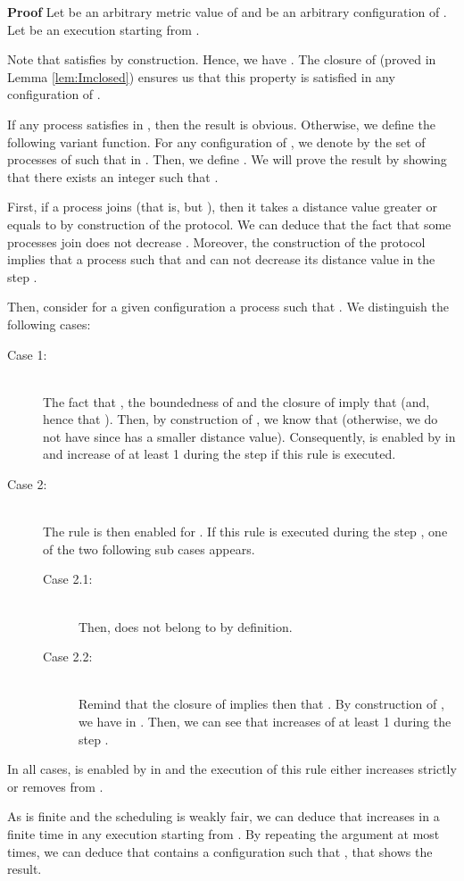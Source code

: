 \documentclass[11pt]{article}
\newenvironment{proof}{\noindent\textbf{Proof}}{\hfill\qed}
\newcommand{\qed}{\hfill}
\begin{document}
\begin{proof}
Let  be an arbitrary metric value of  and  be an arbitrary configuration of . Let  be an execution starting from .

Note that  satisfies  by construction. Hence, we have . The closure  of  (proved in Lemma \ref{lem:Imclosed}) ensures us that this property is satisfied in any configuration of . 

If any process  satisfies  in , then the result is obvious. Otherwise, we define the following variant function. For any configuration  of , we denote by  the set of processes  of  such that  in . Then, we define . We will prove the result by showing that there exists an integer  such that .

First, if a process  joins  (that is,  but ), then it takes a distance value greater or equals to  by construction of the protocol. We can deduce that the fact that some processes join  does not decrease . Moreover, the construction of the protocol implies that a process  such that  and  can not decrease its distance value in the step .

Then, consider for a given configuration  a process  such that . We distinguish the following cases:

\begin{description}
\item[Case 1:] \\
The fact that , the boundedness of  and the closure of  imply that  (and, hence that ). Then, by construction of , we know that  (otherwise, we do not have  since  has a smaller distance value). Consequently,  is enabled by  in  and  increase of at least 1 during the step  if this rule is executed.
\item[Case 2:] \\
The rule  is then enabled for . If this rule is executed during the step , one of the two following sub cases appears.
\begin{description}
\item[Case 2.1:] \\
Then,  does not belong to  by definition. 
\item[Case 2.2:] \\
Remind that the closure of  implies then that . By construction of , we have  in . Then, we can see that  increases of at least 1 during the step .
\end{description}
\end{description}

In all cases,  is enabled by  in  and the execution of this rule either increases strictly  or removes  from .

As  is finite and the scheduling is weakly fair, we can deduce that  increases in a finite time in any execution starting from . By repeating the argument at most  times, we can deduce that  contains a configuration  such that , that shows the result.
\end{proof}
\end{document}

